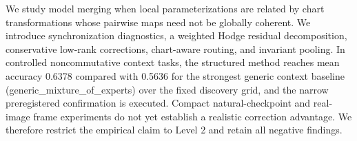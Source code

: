 We study model merging when local parameterizations are related by chart transformations whose pairwise maps need not be globally coherent. We introduce synchronization diagnostics, a weighted Hodge residual decomposition, conservative low-rank corrections, chart-aware routing, and invariant pooling. In controlled noncommutative context tasks, the structured method reaches mean accuracy 0.6378 compared with 0.5636 for the strongest generic context baseline (generic_mixture_of_experts) over the fixed discovery grid, and the narrow preregistered confirmation is executed. Compact natural-checkpoint and real-image frame experiments do not yet establish a realistic correction advantage. We therefore restrict the empirical claim to Level 2 and retain all negative findings.

